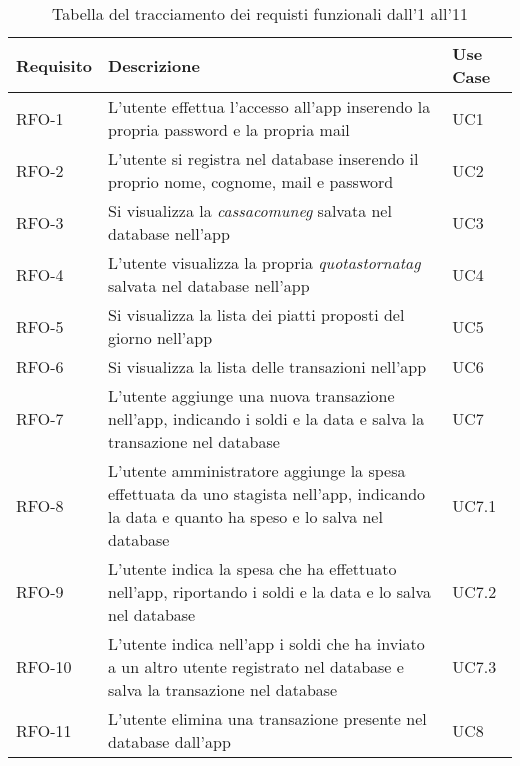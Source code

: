 \begin{table}[htb]%
\caption{Tabella del tracciamento dei requisti funzionali dall'1 all'11}
\label{tab:requisiti-funzionaliuno}
\begin{tabularx}{\textwidth}{lXl}
\hline
\textbf{Requisito} & \textbf{Descrizione} & \textbf{Use Case}\\
\hline\hline
RFO-1     & L'utente effettua l'accesso all'app inserendo la propria password e la propria mail & UC1 \\
\hline
RFO-2     & L'utente si registra nel database inserendo il proprio nome, cognome, mail e password & UC2 \\
\hline
RFO-3     & Si visualizza la \emph{\gls{cassacomuneg}} salvata nel database nell'app & UC3 \\
\hline
RFO-4     & L'utente visualizza la propria \emph{\gls{quotastornatag}} salvata nel database nell'app & UC4 \\
\hline
RFO-5     & Si visualizza la lista dei piatti proposti del giorno nell'app & UC5 \\
\hline
RFO-6     & Si visualizza la lista delle transazioni nell'app & UC6 \\
\hline
RFO-7     & L'utente aggiunge una nuova transazione nell'app, indicando i soldi e la data e salva la transazione nel database & UC7 \\
\hline
RFO-8     & L'utente amministratore aggiunge la spesa effettuata da uno stagista nell'app, indicando la data e quanto ha speso e lo salva nel database & UC7.1 \\
\hline
RFO-9     & L'utente indica la spesa che ha effettuato nell'app, riportando i soldi e la data e lo salva nel database & UC7.2 \\
\hline
RFO-10    & L'utente indica nell'app i soldi che ha inviato a un altro utente registrato nel database e salva la transazione nel database & UC7.3 \\
\hline
RFO-11    & L'utente elimina una transazione presente nel database dall'app & UC8 \\
\hline
\end{tabularx}
\end{table}%

